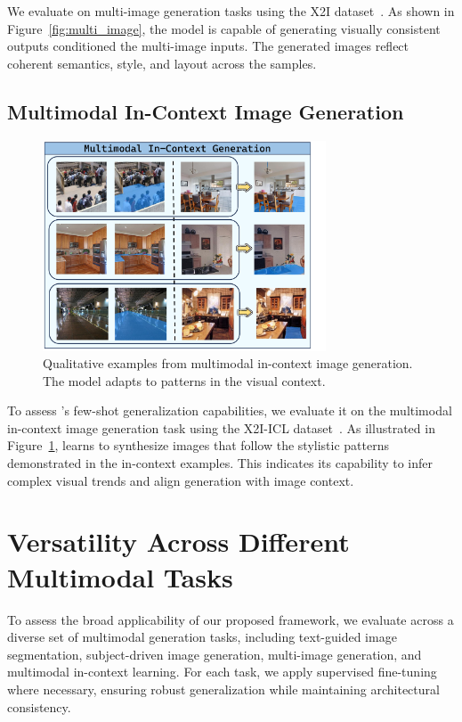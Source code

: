 We evaluate \model on multi-image generation tasks using the X2I dataset~\citep{OmniGen}. As shown in Figure~\ref{fig:multi_image}, the model is capable of generating visually consistent outputs conditioned the multi-image inputs. The generated images reflect coherent semantics, style, and layout across the samples.

\subsection{Multimodal In-Context Image Generation}
\label{sec:mmicl}

\begin{figure}[t]
\centering
\includegraphics[width=0.75\textwidth]{figures/icl_exp.pdf}
\caption{Qualitative examples from multimodal in-context image generation. The model adapts to patterns in the visual context.}
\label{fig:icl_example}
\end{figure}

To assess \model's few-shot generalization capabilities, we evaluate it on the multimodal in-context image generation task using the X2I-ICL dataset~\citep{OmniGen}. As illustrated in Figure~\ref{fig:icl_example}, \model learns to synthesize images that follow the stylistic patterns demonstrated in the in-context examples. This indicates its capability to infer complex visual trends and align generation with image context.

\section{Versatility Across Different Multimodal Tasks}
\label{app:applications}

To assess the broad applicability of our proposed framework, we evaluate \model across a diverse set of multimodal generation tasks, including text-guided image segmentation, subject-driven image generation, multi-image generation, and multimodal in-context learning. For each task, we apply supervised fine-tuning where necessary, ensuring robust generalization while maintaining architectural consistency.

